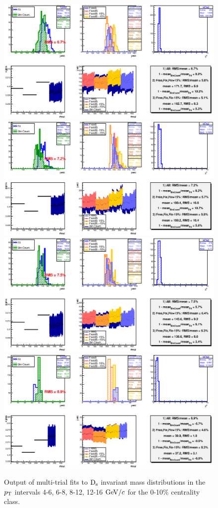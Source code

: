 \begin{figure}[!htb]
 \begin{center}
\includegraphics[angle=0, width=10.cm]{./FigCap5/MT_Pt46_010.eps}
\includegraphics[angle=0, width=10.cm]{./FigCap5/MT_Pt68_010.eps}
\includegraphics[angle=0, width=10.cm]{./FigCap5/MT_Pt812_010.eps}
\includegraphics[angle=0, width=10.cm]{./FigCap5/MT_Pt1216_010.eps}
\end{center}
 \caption{Output of multi-trial fits to ${\rm D_s}$ invariant mass distributions in the $p_{\rm T}$ intervals 4-6, 6-8, 8-12, 12-16 $\mathrm{GeV}/c$  for the 0-10$\%$ centrality class.}
 \label{multitrial_Ds_010}
\end{figure}

